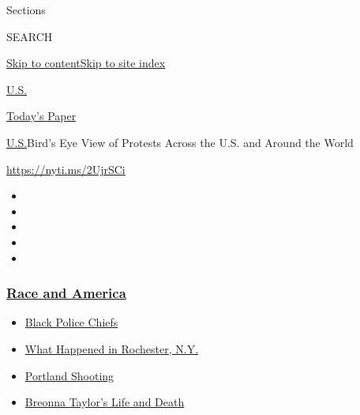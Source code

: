 Sections

SEARCH

\protect\hyperlink{site-content}{Skip to
content}\protect\hyperlink{site-index}{Skip to site index}

\href{https://www.nytimes3xbfgragh.onion/section/us}{U.S.}

\href{https://myaccount.nytimes3xbfgragh.onion/auth/login?response_type=cookie\&client_id=vi}{}

\href{https://www.nytimes3xbfgragh.onion/section/todayspaper}{Today's
Paper}

\href{/section/us}{U.S.}\textbar{}Bird's Eye View of Protests Across the
U.S. and Around the World

\url{https://nyti.ms/2UjrSCi}

\begin{itemize}
\item
\item
\item
\item
\item
\end{itemize}

\hypertarget{race-and-america}{%
\subsubsection{\texorpdfstring{\href{https://www.nytimes3xbfgragh.onion/news-event/george-floyd-protests-minneapolis-new-york-los-angeles?name=styln-george-floyd\&region=TOP_BANNER\&block=storyline_menu_recirc\&action=click\&pgtype=Interactive\&impression_id=6563f8a0-f52f-11ea-ade0-cb4393d0fa4f\&variant=undefined}{Race
and America}}{Race and America}}\label{race-and-america}}

\begin{itemize}
\tightlist
\item
  \href{https://www.nytimes3xbfgragh.onion/2020/09/11/us/black-police-chiefs-reform.html?name=styln-george-floyd\&region=TOP_BANNER\&block=storyline_menu_recirc\&action=click\&pgtype=Interactive\&impression_id=6563f8a1-f52f-11ea-ade0-cb4393d0fa4f\&variant=undefined}{Black
  Police Chiefs}
\item
  \href{https://www.nytimes3xbfgragh.onion/2020/09/04/nyregion/rochester-police-daniel-prude.html?name=styln-george-floyd\&region=TOP_BANNER\&block=storyline_menu_recirc\&action=click\&pgtype=Interactive\&impression_id=6563f8a2-f52f-11ea-ade0-cb4393d0fa4f\&variant=undefined}{What
  Happened in Rochester, N.Y.}
\item
  \href{https://www.nytimes3xbfgragh.onion/2020/08/30/us/portland-shooting-explained.html?name=styln-george-floyd\&region=TOP_BANNER\&block=storyline_menu_recirc\&action=click\&pgtype=Interactive\&impression_id=6563f8a3-f52f-11ea-ade0-cb4393d0fa4f\&variant=undefined}{Portland
  Shooting}
\item
  \href{https://www.nytimes3xbfgragh.onion/2020/08/30/us/breonna-taylor-police-killing.html?name=styln-george-floyd\&region=TOP_BANNER\&block=storyline_menu_recirc\&action=click\&pgtype=Interactive\&impression_id=6563f8a4-f52f-11ea-ade0-cb4393d0fa4f\&variant=undefined}{Breonna
  Taylor's Life and Death}
\end{itemize}

